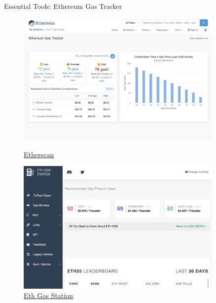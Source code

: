 \documentclass[]{beamer}
\begin{document}
\begin{frame}{Essential Tools: Ethereum Gas Tracker}
	\begin{figure}
	\centering
	\begin{minipage}{.45\textwidth}
  		\centering
  		\includegraphics[width=0.9\textwidth]{../assets/images/etherscan.png}
  		\caption*{\footnotesize \href{https://etherscan.io/}{\link Etherscan}}
	\end{minipage}
	\begin{minipage}{.45\textwidth}
  		\centering
  		\includegraphics[width=0.9\textwidth]{../assets/images/eth-gas-station.png}
  		\caption*{\footnotesize \href{https://www.Ethgasstation.info}{\link Eth Gas Station}}
	\end{minipage}
	\end{figure}
\end{frame}
\end{document}
